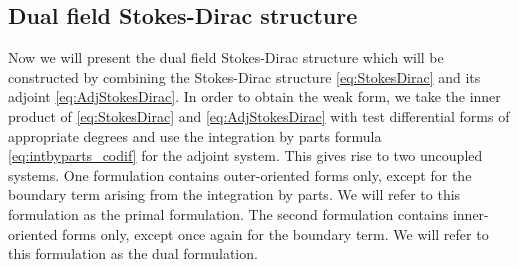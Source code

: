 \documentclass{elsarticle}
\newcommand{\revTwo}[1]{{\color{black}#1}}
\begin{document}
\subsection{Dual field Stokes-Dirac structure}
Now we will present the dual field Stokes-Dirac structure which will be constructed by combining the Stokes-Dirac structure \eqref{eq:StokesDirac} and its adjoint \eqref{eq:AdjStokesDirac}. In order to obtain the weak form, we take the inner product of \eqref{eq:StokesDirac} and \eqref{eq:AdjStokesDirac} with test differential forms of appropriate degrees and use the integration by parts formula \eqref{eq:intbyparts_codif} for the adjoint system. \revTwo{This gives rise to two uncoupled systems. One formulation contains outer-oriented forms only, except for the boundary term arising from the integration by parts. We will refer to this formulation as the primal formulation. The second formulation contains inner-oriented forms only, except once again for the boundary term. We will refer to this formulation as the dual formulation.} 
\end{document}
